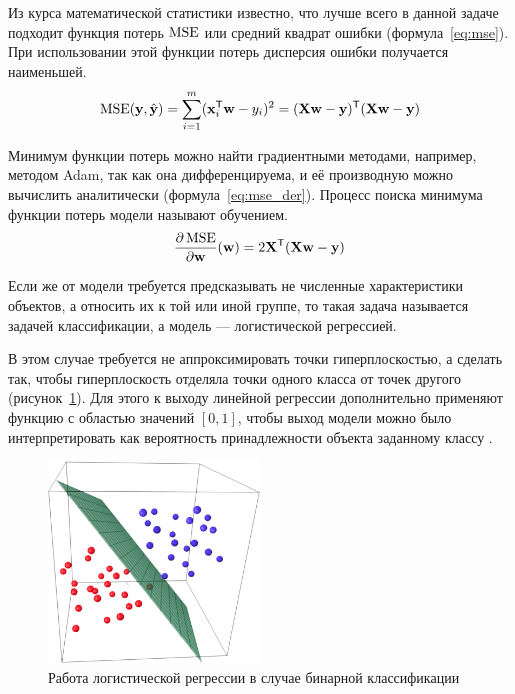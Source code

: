 Из курса математической статистики известно, что лучше всего в данной задаче подходит функция потерь $\operatorname{MSE}$ или средний квадрат ошибки (формула \ref*{eq:mse}). При использовании этой функции потерь дисперсия ошибки получается наименьшей.
\begin{equation}
    \label{eq:mse}
    \operatorname{MSE}(\mathbf{y},\hat{\mathbf{y}})=\sum\limits_{i=1}^m(\mathbf{x}_i^\mathsf{T}\mathbf{w}-y_i)^2=(\mathbf{X}\mathbf{w}-\mathbf{y})^\mathsf{T}(\mathbf{X}\mathbf{w}-\mathbf{y})
\end{equation}

Минимум функции потерь можно найти градиентными методами, например, методом Adam, так как она дифференцируема, и её производную можно вычислить аналитически (формула \ref*{eq:mse_der}). Процесс поиска минимума функции потерь модели называют обучением.
\begin{equation}
    \label{eq:mse_der}
    \frac{\partial\operatorname{MSE}}{\partial \mathbf{w}}(\mathbf{w})=2\mathbf{X}^\mathsf{T}(\mathbf{X}\mathbf{w}-\mathbf{y})
\end{equation}

Если же от модели требуется предсказывать не численные характеристики объектов, а относить их к той или иной группе, то такая задача называется задачей классификации, а модель --- логистической регрессией.

В этом случае требуется не аппроксимировать точки гиперплоскостью, а сделать так, чтобы гиперплоскость отделяла точки одного класса от точек другого (рисунок \ref*{fig:log_reg}). Для этого к выходу линейной регрессии дополнительно применяют функцию с областью значений $[0, 1]$, чтобы выход модели можно было интерпретировать как вероятность принадлежности объекта заданному классу \cite{art:linear_models}.
\begin{figure}[h]
    \centering
    \includegraphics[width=0.5\textwidth]{../inc/images/logistic_regression.png}
    \caption{Работа логистической регрессии в случае бинарной классификации}
    \label{fig:log_reg}
\end{figure}

